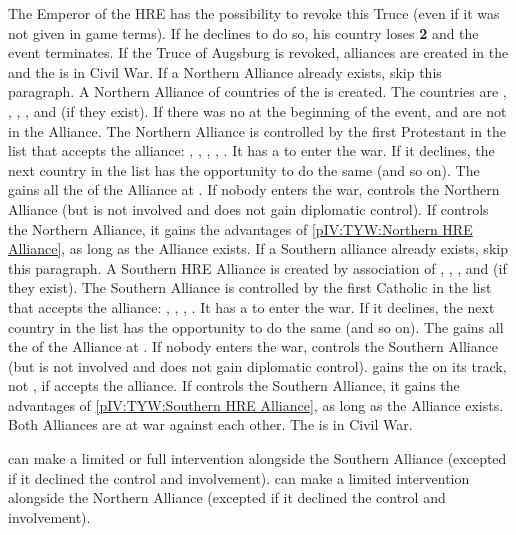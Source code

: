 \phevnt
\aparag The Emperor of the HRE has the possibility to revoke this Truce (even
if it was not given in game terms). If he declines to do so, his country loses
{\bf 2 \STAB} and the event terminates.  If the Truce of Augsburg is revoked,
alliances are created in the \HRE and the \HRE is in Civil War.
 If a Northern Alliance already exists, skip this
paragraph.
\bparag A Northern Alliance of countries of the \HRE is created.  The
countries are \paysOldenburg, \paysHanovre, \paysHesse, \paysHanse, and
\paysBerg (if they exist). If there was no  at the
beginning of the event,  and  are not in the Alliance.
\bparag The Northern Alliance is controlled by the first Protestant \MAJ in
the list that accepts the alliance: \HOL, \ENG, \SUE, \FRA, \POL.  It has a
\CB to enter the war. If it declines, the next country in the list has the
opportunity to do the same (and so on).  The \MAJ gains all the \MIN of the
Alliance at \EW.  If nobody enters the war, \SUE controls the Northern
Alliance (but is not involved and does not gain diplomatic control).
\bparag If \HOL controls the Northern Alliance, it gains the advantages of
\ref{pIV:TYW:Northern HRE Alliance}, as long as the Alliance exists.
 If a Southern alliance already exists, skip this
paragraph.
\bparag A Southern HRE Alliance is created by association of \paysBaviere,
\paysMayence, \paysAlsace, \paysBade and \paysWurtemberg (if they exist).
\bparag The Southern Alliance is controlled by the first Catholic \MAJ in the
list that accepts the alliance: \AUS, \SPA, \POL, \FRA.  It has a \CB to enter
the war. If it declines, the next country in the list has the opportunity to
do the same (and so on).  The \MAJ gains all the \MIN of the Alliance at \EW.
If nobody enters the war, \MAJHAB controls the Southern Alliance (but is not
involved and does not gain diplomatic control).
\bparag \AUSMin gains the \MIN on its track, not \SPA, if \SPA accepts the
alliance.
\bparag If \MAJHAB controls the Southern Alliance, it gains the advantages of
\ref{pIV:TYW:Southern HRE Alliance}, as long as the Alliance exists.
\aparag Both Alliances are at war against each other.  The \HRE is in Civil
War.

\phdipl
\aparag \SPA can make a limited or full intervention alongside the Southern
Alliance (excepted if it declined the control and involvement).
\aparag \SUE can make a limited intervention alongside the Northern Alliance
(excepted if it declined the control and involvement).

